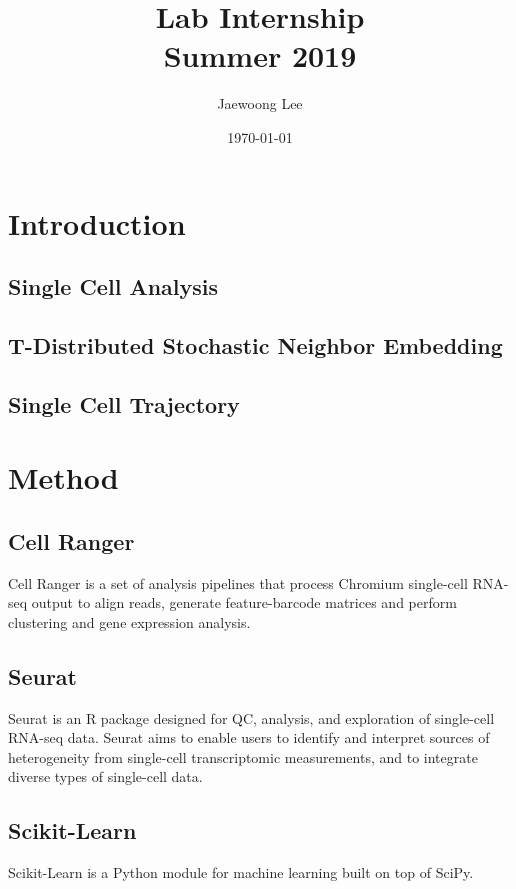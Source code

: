 \documentclass[aps, 10pt, a4paper]{article}
\title{Lab Internship\\Summer 2019}
\author{Jaewoong Lee}
\date{\today}
\begin{document}
    \maketitle
    \newpage
    
    \tableofcontents
    \listoftables
    \listoffigures
    \listoflistings
    \newpage
    
    \section{Introduction}
        \subsection{Single Cell Analysis}
        
        \subsection{T-Distributed Stochastic Neighbor Embedding}
        
        \subsection{Single Cell Trajectory}
    
    \section{Method}
        \subsection{Cell Ranger}
            Cell Ranger is a set of analysis pipelines that process Chromium single-cell RNA-seq output to align reads, generate feature-barcode matrices and perform clustering and gene expression analysis. \cite{ref:cellranger}
        
        \subsection{Seurat}
            Seurat is an R package designed for QC, analysis, and exploration of single-cell RNA-seq data. Seurat aims to enable users to identify and interpret sources of heterogeneity from single-cell transcriptomic measurements, and to integrate diverse types of single-cell data. \cite{ref:seurat1, ref:seurat2}
        
        \subsection{Scikit-Learn}
            Scikit-Learn is a Python module for machine learning built on top of SciPy. \cite{ref:scikit}
    
\end{document}
